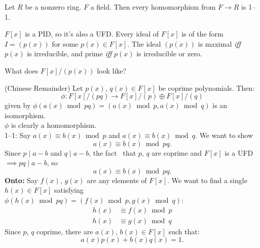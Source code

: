 \fact Let $R$ be a nonzero ring.  $F$ a field.  Then every homomorphism from $F\to R$ is 1--1.

$F[x]$ is a PID, so it's also a UFD.  Every ideal of $F[x]$ is of the form $I=(p(x))$ for some $p(x)\in F[x]$.  The ideal $(p(x))$ is maximal \emph{iff} $p(x)$ is irreducible, and prime \emph{iff} $p(x)$ is irreducible or zero.

What does $F[x]/(p(x))$ look like?

\thm (Chinese Remainder) Let $p(x)$, $q(x)\in F[x]$ be coprime polynomials.  Then:
\[ \phi\colon F[x]/(pq)\to F[x]/(p) \oplus F[x]/(q) \]
given by $\phi(a(x)\bmod pq)=(a(x)\bmod p,a(x)\bmod q)$ is an isomorphism. \\
\pf $\phi$ is clearly a homomorphism. \\
1--1: Say $a(x)\equiv b(x)\bmod p$
and $a(x)\equiv b(x)\bmod q$.  We want to show
\[ a(x) \equiv b(x) \bmod pq . \]
Since $p\mid a-b$ and $q\mid a-b$, the fact%
\ that $p$, $q$ are coprime and $F[x]$ is a UFD $\implies pq\mid a-b$, so
\[ a(x) \equiv b(x) \bmod pq . \]
\textbf{Onto:} Say $f(x)$, $g(x)$ are any elements of $F[x]$.  We want to find a single $h(x)\in F[x]$ satisfying $\phi(h(x)\bmod pq)=(f(x)\bmod p,g(x)\bmod q)$:
\begin{align*}
h(x) &\equiv f(x) \bmod p \\
h(x) &\equiv g(x) \bmod q
\end{align*}
Since $p$, $q$ coprime, there are $a(x)$, $b(x)\in F[x]$ such that:
\[ a(x)p(x) + b(x)q(x) = 1 . \]
